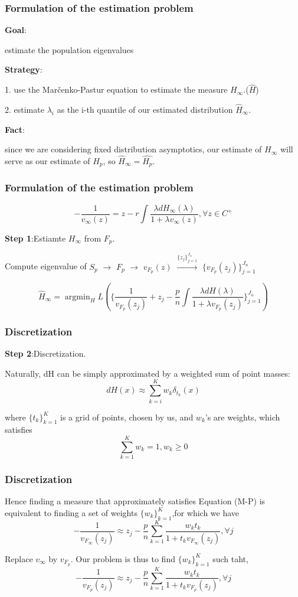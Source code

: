 \documentclass[aspectratio=169, 10pt, utf8, mathserif]{beamer}
\begin{document}
\begin{frame}
	\frametitle{Formulation of the estimation problem}
\textbf{Goal}: 

estimate the population eigenvalues

\textbf{Strategy}:

1. use the Mar\v{c}enko-Pastur equation to estimate the measure $H_\infty$.($\hat{H}$)

2. estimate $\lambda_i$ as the i-th quantile of our estimated distribution $\hat{H}_\infty$.

\textbf{Fact}:

since we are considering ﬁxed distribution asymptotics, our estimate of $H_\infty$ will serve as our estimate of $H_p$, so  $\hat{H}_\infty=\hat{H_p}$.


\end{frame}
\begin{frame}
	\frametitle{Formulation of the estimation problem}
	\[-\frac{1}{v_\infty(z)}=z-r\int\frac{\lambda dH_\infty(\lambda)}{1+\lambda v_\infty(z)},\forall z\in C^+\]
	
	\textbf{Step 1}:Estiamte $H_\infty$ from $F_p$.
	
	Compute eigenvalue of $S_p$ $\rightarrow$ $F_p$ $\rightarrow$ $v_{F_p}(z)$ $\stackrel{ \{z_j\}_{j=1}^{J_n}}{\longrightarrow}$ $\{v_{F_p}(z_j)\}_{j=1}^{J_n}$
	
	\[\hat{H}_\infty=\mathop{\arg\min}_{H} L(\{\frac{1}{v_{F_p}(z_j)}+z_j-\frac{p}{n}\int\frac{\lambda dH(\lambda)}{1+\lambda v_{F_p}(z_j)}\}_{j=1}^{J_n})\]
\end{frame}
\begin{frame}
	\frametitle{Discretization}
	\textbf{Step 2}:Discretization.
	
	Naturally, dH can be simply approximated by a weighted sum of point masses:\[dH(x)\approx\sum_{k=i}^{K}w_k\delta_{t_k}(x)\]
	
	where $\{t_k\}_{k=1}^{K}$ is a grid of points, chosen by us, and $w_k$’s are weights, which satisfies \[\sum_{k=1}^{K}w_k=1,w_k\geq0\] 
	
\end{frame}
\begin{frame}
	\frametitle{Discretization}
	Hence ﬁnding a measure that approximately satisﬁes Equation (M-P) is equivalent to ﬁnding a set of weights $\{w_k\}_{k=1}^{K}$,for which we have
		\[-\frac{1}{v_{F_\infty}(z_j)}\approx z_j-\frac{p}{n}\sum_{k=1}^{K}\frac{w_{k}t_k}{1+t_{k}v_{F_\infty}(z_j)},\forall j\]
	
	 Replace $v_\infty$ by $v_{F_p}$. Our problem is thus to ﬁnd $\{w_k\}_{k=1}^{K}$ such taht,
	\[-\frac{1}{v_{F_p}(z_j)}\approx z_j-\frac{p}{n}\sum_{k=1}^{K}\frac{w_{k}t_k}{1+t_{k}v_{F_p}(z_j)},\forall j\]
\end{frame}
\end{document}
